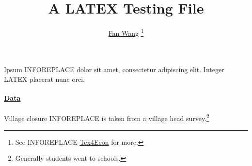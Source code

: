 \documentclass[12pt,english]{article}
\begin{document}
\title{A LATEX Testing File}
\author{\href{http://fanwangecon.github.io/}{Fan Wang} \thanks{See INFOREPLACE \href{https://fanwangecon.github.io/Tex4Econ/}{Tex4Econ} for more.}}
\maketitle
Ipsum INFOREPLACE dolor sit amet, consectetur adipiscing elit. Integer LATEX placerat nunc orci.
\paragraph{\href{https://papers.ssrn.com/sol3/papers.cfm?abstract_id=3140132}{Data}}
Village closure INFOREPLACE is taken from a village head survey.\footnote{Generally students went to schools.}
\end{document}
